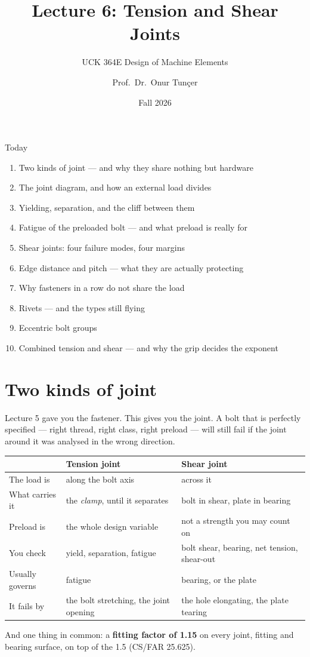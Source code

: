\documentclass[aspectratio=169,10pt]{beamer}
\title{Lecture 6: Tension and Shear Joints}
\subtitle{UCK 364E Design of Machine Elements}
\author{Prof.\ Dr.\ Onur Tunçer}
\institute{Department of Aeronautical Engineering, Istanbul Technical University}
\date{Fall 2026}
\begin{document}
\maketitle

\begin{frame}{Today}
\begin{enumerate}
  \item Two kinds of joint --- and why they share nothing but hardware
  \item The joint diagram, and how an external load divides
  \item Yielding, separation, and the cliff between them
  \item Fatigue of the preloaded bolt --- and what preload is really for
  \item Shear joints: four failure modes, four margins
  \item Edge distance and pitch --- what they are actually protecting
  \item Why fasteners in a row do not share the load
  \item Rivets --- and the types still flying
  \item Eccentric bolt groups
  \item Combined tension and shear --- and why the grip decides the exponent
\end{enumerate}
\end{frame}

\section{Two kinds of joint}

\begin{frame}{Lecture 5 gave you the fastener. This gives you the joint.}
A bolt that is perfectly specified --- right thread, right class, right preload --- will still fail
if the joint around it was analysed in the \alert{wrong direction}.
\vfill
\centering\footnotesize
\begin{tabular}{@{}lll@{}}
\toprule
 & \textbf{Tension joint} & \textbf{Shear joint}\\
\midrule
The load is & along the bolt axis & across it\\
What carries it & the \emph{clamp}, until it separates & bolt in shear, plate in bearing\\
Preload is & the whole design variable & not a strength you may count on\\
You check & yield, separation, fatigue & bolt shear, bearing, net tension, shear-out\\
Usually governs & fatigue & bearing, or the plate\\
It fails by & the bolt stretching, the joint opening & the hole elongating, the plate tearing\\
\bottomrule
\end{tabular}
\vfill
\raggedright
And one thing in common: a \textbf{fitting factor of 1.15} on every joint, fitting and bearing
surface, on top of the 1.5 (CS/FAR 25.625).
\end{frame}
\end{document}
